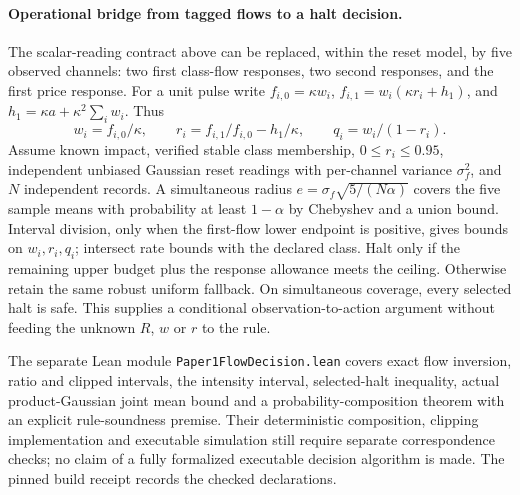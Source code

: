 \paragraph{Operational bridge from tagged flows to a halt decision.}
The scalar-reading contract above can be replaced, within the reset model, by five observed channels: two first class-flow responses, two second responses, and the first price response. For a unit pulse write $f_{i,0}=\kappa w_i$, $f_{i,1}=w_i(\kappa r_i+h_1)$, and $h_1=\kappa a+\kappa^2\sum_iw_i$. Thus
\[
 w_i=f_{i,0}/\kappa,\qquad r_i=f_{i,1}/f_{i,0}-h_1/\kappa,\qquad q_i=w_i/(1-r_i).
\]
Assume known impact, verified stable class membership, $0\le r_i\le0.95$, independent unbiased Gaussian reset readings with per-channel variance $\sigma_f^2$, and $N$ independent records. A simultaneous radius $e=\sigma_f\sqrt{5/(N\alpha)}$ covers the five sample means with probability at least $1-\alpha$ by Chebyshev and a union bound. Interval division, only when the first-flow lower endpoint is positive, gives bounds on $w_i,r_i,q_i$; intersect rate bounds with the declared class. Halt only if the remaining upper budget plus the response allowance meets the ceiling. Otherwise retain the same robust uniform fallback. On simultaneous coverage, every selected halt is safe. This supplies a conditional observation-to-action argument without feeding the unknown $R$, $w$ or $r$ to the rule.

The separate Lean module \nolinkurl{Paper1FlowDecision.lean} covers exact flow inversion, ratio and clipped intervals, the intensity interval, selected-halt inequality, actual product-Gaussian joint mean bound and a probability-composition theorem with an explicit rule-soundness premise. Their deterministic composition, clipping implementation and executable simulation still require separate correspondence checks; no claim of a fully formalized executable decision algorithm is made. The pinned build receipt records the checked declarations.

